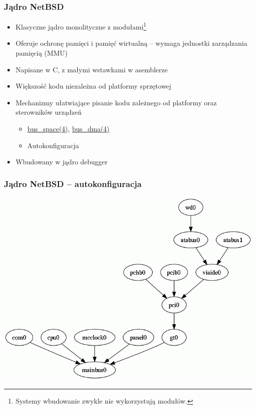 \documentclass[dvipsnames,table]{beamer}
\begin{document}
\begin{frame}
\frametitle{Jądro NetBSD}
\begin{itemize}
	\item Klasyczne jądro monolityczne z modułami\footnote{Systemy wbudowanie zwykle nie wykorzystują modułów.}
	\item Oferuje ochronę pamięci i pamięć wirtualną -- wymaga jednostki zarządzania pamięcią (MMU)
	\item Napisane w C, z małymi wstawkami w asemblerze
	\item Większość kodu niezależna od platformy sprzętowej
	\item Mechanizmy ułatwiające pisanie kodu zależnego od platformy oraz sterowników urządzeń
	\begin{itemize}
		\item \href{http://netbsd.gw.com/cgi-bin/man-cgi?bus_space++NetBSD-current}{bus\_space(4)}, \href{http://netbsd.gw.com/cgi-bin/man-cgi?bus_dma++NetBSD-current}{bus\_dma(4)}
		\item Autokonfiguracja
	\end{itemize}
	\item Wbudowany w jądro debugger
\end{itemize}
\end{frame}


\begin{frame}
\frametitle{Jądro NetBSD -- autokonfiguracja}
\begin{center}
	\includegraphics[scale=0.4]{img_cobaltdmesg.png}
\end{center}
\end{frame}
\end{document}
